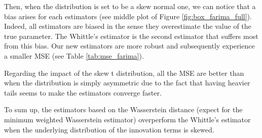 \documentclass[
  11pt,
]{article}
\begin{document}
Then, when the distribution is set to be a skew normal one, we can
notice that a bias arises for each estimators (see middle plot of Figure
\ref{fig:box_farima_full}). Indeed, all estimators are biased in the
sense they overestimate the value of the true parameter. The Whittle's
estimator is the second estimator that suffers most from this bias. Our
new estimators are more robust and subsequently experience a smaller MSE
(see Table \ref{tab:mse_farima}).

Regarding the impact of the skew t distribution, all the MSE are better
than when the distribution is simply asymmetric due to the fact that
having heavier tails seems to make the estimators converge faster.

To sum up, the estimators based on the Wasserstein distance (expect for
the minimum weighted Wasserstein estimator) overperform the Whittle's
estimator when the underlying distribution of the innovation terms is
skewed.
\end{document}
